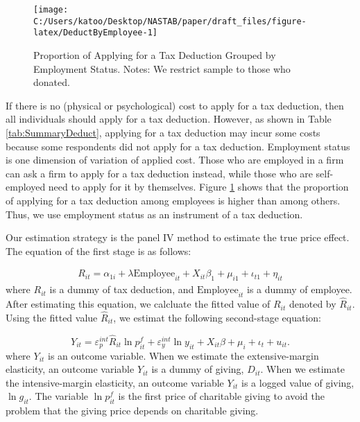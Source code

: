 \documentclass[
  11pt,
  a4paper,
]{article}
\begin{document}
\begin{figure}[t]

{\centering \texttt{[image: C:/Users/katoo/Desktop/NASTAB/paper/draft\_files/figure-latex/DeductByEmployee-1]} 

}

\caption{Proportion of Applying for a Tax Deduction Grouped by Employment Status. Notes: We restrict sample to those who donated.}\label{fig:DeductByEmployee}
\end{figure}

If there is no (physical or psychological) cost to apply for a tax deduction,
then all individuals should apply for a tax deduction.
However, as shown in Table \ref{tab:SummaryDeduct},
applying for a tax deduction may incur some costs because some respondents did not apply for a tax deduction.
Employment status is one dimension of variation of applied cost.
Those who are employed in a firm can ask a firm to apply for a tax deduction instead,
while those who are self-employed need to apply for it by themselves.
Figure \ref{fig:DeductByEmployee} shows that
the proportion of applying for a tax deduction among employees is higher than among others.
Thus, we use employment status as an instrument of a tax deduction.

Our estimation strategy is the panel IV method to estimate the true price effect.
The equation of the first stage is as follows:

\begin{align}
  R_{it}
  = \alpha_{1i} + \lambda \text{Employee}_{it} + X_{it} \beta_1
  + \mu_{i1} + \iota_{t1} + \eta_{it} \label{eq:stage1}
\end{align}
where \(R_{it}\) is a dummy of tax deduction, and \(\text{Employee}_{it}\) is a dummy of employee.
After estimating this equation, we calcluate the fitted value of \(R_{it}\) denoted by \(\hat{R}_{it}\).
Using the fitted value \(\hat{R}_{it}\), we estimat the following second-stage equation:

\begin{equation}
    Y_{it} = \varepsilon^{int}_p \hat{R}_{it} \ln p^f_{it} + \varepsilon^{int}_y \ln y_{it} 
    + X_{it}\beta +\mu_i +\iota_t +u_{it}. \label{eq:stage2}
\end{equation}
where \(Y_{it}\) is an outcome variable.
When we estimate the extensive-margin elasticity,
an outcome variable \(Y_{it}\) is a dummy of giving, \(D_{it}\).
When we estimate the intensive-margin elasticity,
an outcome variable \(Y_{it}\) is a logged value of giving, \(\ln g_{it}\).
The variable \(\ln p^f_{it}\) is the first price of charitable giving
to avoid the problem that the giving price depends on charitable giving.
\end{document}
